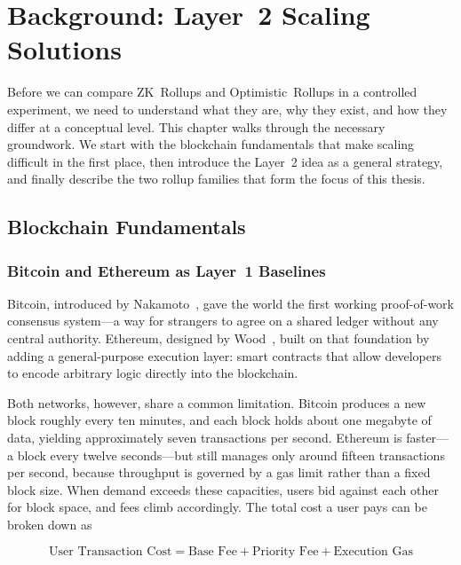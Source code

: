 \chapter{Background: Layer~2 Scaling Solutions}
\label{ch:background}

Before we can compare ZK~Rollups and Optimistic~Rollups in a controlled experiment, we need to understand what they are, why they exist, and how they differ at a conceptual level. This chapter walks through the necessary groundwork. We start with the blockchain fundamentals that make scaling difficult in the first place, then introduce the Layer~2 idea as a general strategy, and finally describe the two rollup families that form the focus of this thesis.

\section{Blockchain Fundamentals}

\subsection{Bitcoin and Ethereum as Layer~1 Baselines}

Bitcoin, introduced by Nakamoto~\cite{nakamoto2008bitcoin}, gave the world the first working proof-of-work consensus system---a way for strangers to agree on a shared ledger without any central authority. Ethereum, designed by Wood~\cite{wood2014ethereum}, built on that foundation by adding a general-purpose execution layer: smart contracts that allow developers to encode arbitrary logic directly into the blockchain.

Both networks, however, share a common limitation. Bitcoin produces a new block roughly every ten minutes, and each block holds about one megabyte of data, yielding approximately seven transactions per second. Ethereum is faster---a block every twelve seconds---but still manages only around fifteen transactions per second, because throughput is governed by a gas limit rather than a fixed block size. When demand exceeds these capacities, users bid against each other for block space, and fees climb accordingly. The total cost a user pays can be broken down as

\begin{equation}
\text{User Transaction Cost} = \text{Base Fee} + \text{Priority Fee} + \text{Execution Gas}
\end{equation}

